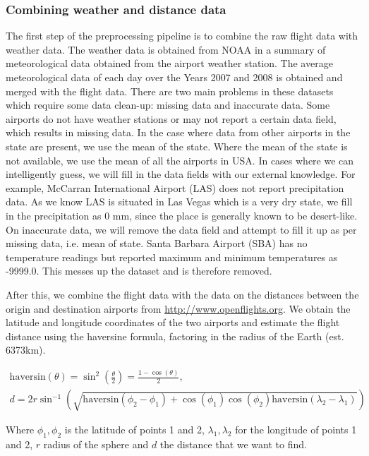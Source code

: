 \documentclass[letterpaper,11pt]{article}
\begin{document}
\subsubsection{Combining weather and distance data}
The first step of the preprocessing pipeline is to combine the raw flight data with weather data. The weather data is obtained from NOAA in a summary of meteorological data obtained from the airport weather station. The average meteorological data of each day over the Years 2007 and 2008 is obtained and merged with the flight data. There are two main problems in these datasets which require some data clean-up: missing data and inaccurate data. Some airports do not have weather stations or may not report a certain data field, which results in missing data. In the case where data from other airports in the state are present, we use the mean of the state. Where the mean of the state is not available, we use the mean of all the airports in USA. In cases where we can intelligently guess, we will fill in the data fields with our external knowledge. For example, McCarran International Airport (LAS) does not report precipitation data. As we know LAS is situated in Las Vegas which is a very dry state, we fill in the precipitation as 0 mm, since the place is generally known to be desert-like. On inaccurate data, we will remove the data field and attempt to fill it up as per missing data, i.e. mean of state. Santa Barbara Airport (SBA) has no temperature readings but reported maximum and minimum temperatures as -9999.0. This messes up the dataset and is therefore removed. 

After this, we combine the flight data with the data on the distances between the origin and destination airports from \url{http://www.openflights.org}. We obtain the latitude and longitude coordinates of the two airports and estimate the flight distance using the haversine formula, factoring in the radius of the Earth (est. 6373km).

\begin{multline}
\scriptstyle \text{haversin}(\theta)=\sin^2\left(\frac\theta2\right)=\frac{1-\cos(\theta)}2, \\
\scriptstyle d=2r\sin^{-1}\left(\sqrt{\text{haversin}(\phi_2-\phi_1)+\cos(\phi_1)\cos(\phi_2)\text{haversin}(\lambda_2-\lambda_1)}\right)
\end{multline}

Where $\phi_1, \phi_2$ is the latitude of points 1 and 2, $\lambda_1, \lambda_2$ for the longitude of points 1 and 2, $r$ radius of the sphere and $d$ the distance that we want to find.
\end{document}

